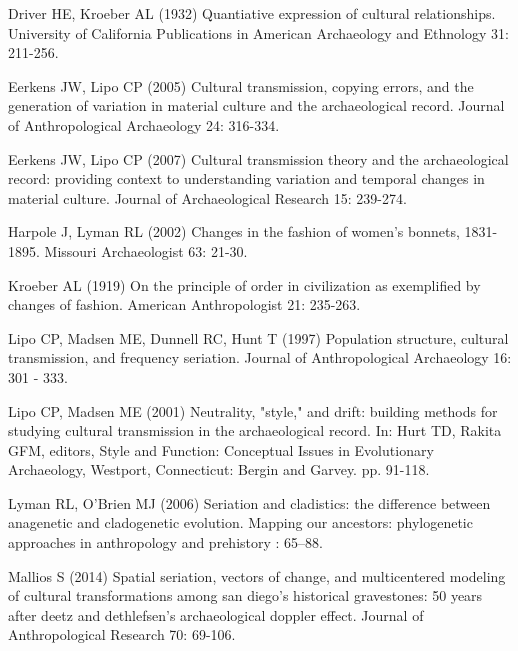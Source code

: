 \documentclass[10pt,letterpaper]{article}
\begin{document}
\begin{thebibliography}{10}
Driver HE, Kroeber AL (1932) Quantiative expression of cultural relationships.
\newblock University of California Publications in American Archaeology and
  Ethnology 31: 211-256.

Eerkens JW, Lipo CP (2005) Cultural transmission, copying errors, and the
  generation of variation in material culture and the archaeological record.
\newblock Journal of Anthropological Archaeology 24: 316-334.

Eerkens JW, Lipo CP (2007) Cultural transmission theory and the archaeological
  record: providing context to understanding variation and temporal changes in
  material culture.
\newblock Journal of Archaeological Research 15: 239-274.

Harpole J, Lyman RL (2002) Changes in the fashion of women's bonnets,
  1831-1895.
\newblock Missouri Archaeologist 63: 21-30.

Kroeber AL (1919) On the principle of order in civilization as exemplified by
  changes of fashion.
\newblock American Anthropologist 21: 235-263.

Lipo CP, Madsen ME, Dunnell RC, Hunt T (1997) Population structure, cultural
  transmission, and frequency seriation.
\newblock Journal of Anthropological Archaeology 16: 301 - 333.

Lipo CP, Madsen ME (2001) Neutrality, "style," and drift: building methods for
  studying cultural transmission in the archaeological record.
\newblock In: Hurt TD, Rakita GFM, editors, Style and Function: Conceptual
  Issues in Evolutionary Archaeology, Westport, Connecticut: Bergin and Garvey.
  pp. 91-118.

Lyman RL, O'Brien MJ (2006) Seriation and cladistics: the difference between
  anagenetic and cladogenetic evolution.
\newblock Mapping our ancestors: phylogenetic approaches in anthropology and
  prehistory : 65--88.

Mallios S (2014) Spatial seriation, vectors of change, and multicentered
  modeling of cultural transformations among san diego's historical
  gravestones: 50 years after deetz and dethlefsen's archaeological doppler
  effect.
\newblock Journal of Anthropological Research 70: 69-106.


\end{thebibliography}
\end{document}

